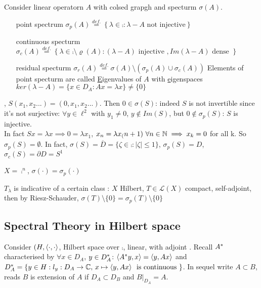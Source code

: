 \documentclass{article}
\begin{document}
\begin{definition}\nl
    Consider linear operatorn $A$ with colsed grapgh and specturm $\sigma(A)$.
    \begin{itemize}
        \item [point spectrum] $\sigma_p(A)\stackrel{def.}{=}
        \left\{
        \lambda\in \comp :\lambda-A \text{ not  injective}
        \right\}$
        \item [continuous specturm] $\sigma_c(A)\stackrel{def.}{=}
        \left\{
        \lambda\in\comp\setminus\varrho(A):(\lambda-A) \text{ injective }, Im(\lambda-A) \text{ dense }        
        \right\}$
        \item [residual specturm] $\sigma_r(A)\stackrel{def.}{=}\sigma(A)\setminus(
        \sigma_p(A)\cup\sigma_c(A))$         Elements of point specturm are called {\underline Eigenvalues of $A$} with {\underline eigenspaces} $ker(\lambda-A)=\{x\in D_A:Ax=\lambda x\}\neq\{0\}$
    \end{itemize}
\end{definition}

\begin{example}\nl
    , $S(x_1,x_2...)=(0,x_1,x_2...)$. Then $0\in\sigma(S)$: indeed $S$ is not invertible since it's not surjective: $\forall y\in\ell^2$ with $y_1\neq0$, $ y\notin Im(S)$, but $0\notin\sigma_p(S)$: $S$ is injective.\\
    In fact $Sx=\lambda x\implies0=\lambda x_1$, $x_n=\lambda x_(n+1)\,\,\forall n\in\mathbb{N}\implies x_k=0$ for all k. So $\sigma_p(S)=\emptyset$. In fact, $\sigma(S)=\overline{D}=\{\zeta\in\comp:|\zeta|\leq1\}$, $\sigma_p(S)=D$, $\sigma_c(S)=\partial D=S^1$
\end{example} 
\begin{example}\nl
    $X=\comp^n$, $\sigma(\cdot)=\sigma_p(\cdot)$
\end{example}
\begin{example}\nl
    $T_\lambda$ is indicative of a certain class : $ X$ Hilbert, $T\in\mathcal{L}(X)$ compact, self-adjoint, then by Riesz-Schauder, $\sigma(T)\setminus\{0\}=\sigma_p(T)\setminus\{0\}
    $
\end{example}

\subsection{Spectral Theory in Hilbert space}
Consider $(H,\left<{\cdot},{\cdot}\right>$, Hilbert space over $\comp$,  linear, with adjoint . Recall ${A}^*$ characterised by $\forall x\in D_A$, $y\in D_{A}^*$: $\left<{{A}^*y},{x}\right>=\left<{y},{Ax}\right>$ and $D_{A}^*=\{y\in H : l_y:D_A\to \mathbb{C},\,x\mapsto \left<{y},{Ax}\right>\,\text{ is continuous }\}$.
In sequel write $A\subset B$, reads $B$ is extension of $A$ if $D_A\subset D_B$ and $B|_{D_A}=A$.
\end{document}
